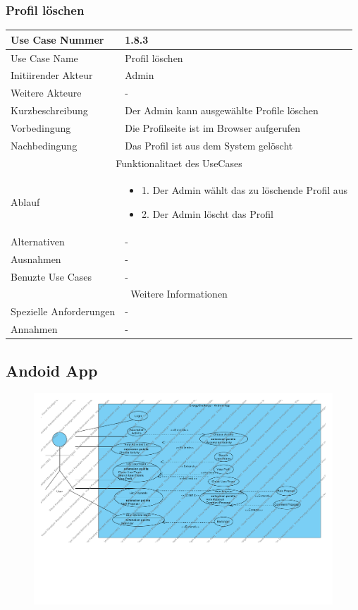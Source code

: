 \documentclass[10pt,a4paper]{article}
\begin{document}
			\subsubsection{Profil l\"oschen}
		\begin{tabular}{|l|p{.5\linewidth}|}
		\hline Use Case Nummer & 1.8.3 \\ 
		\hline Use Case Name & Profil l\"oschen \\ 
		\hline Initiirender Akteur & Admin \\
		\hline Weitere Akteure & - \\
		\hline Kurzbeschreibung & Der Admin kann ausgew\"ahlte Profile l\"oschen \\
		\hline Vorbedingung & Die Profilseite ist im Browser aufgerufen \\
		\hline Nachbedingung & Das Profil ist aus dem System gel\"oscht \\
		\hline \multicolumn{2}{|c|}{Funktionalitaet des UseCases}\\
		\hline  Ablauf & \begin{itemize}
					\item 1. Der Admin w\"ahlt das zu löschende Profil aus
					\item 2. Der Admin l\"oscht das Profil
				\end{itemize}\\
		\hline Alternativen & - \\
		\hline Ausnahmen & - \\
		\hline Benuzte Use Cases & - \\
		\hline \multicolumn{2}{|c|}{Weitere Informationen} \\
		\hline Spezielle Anforderungen & - \\
		\hline Annahmen & - \\
		\hline
		\end{tabular}
\subsection{Andoid App}
\begin{figure}[h]
		\includegraphics[width=\linewidth]{gfx/androidapp/overview.pdf}
	\end{figure}
\end{document}
